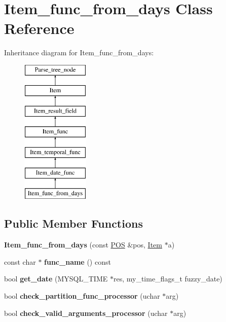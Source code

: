\hypertarget{classItem__func__from__days}{}\section{Item\+\_\+func\+\_\+from\+\_\+days Class Reference}
\label{classItem__func__from__days}
Inheritance diagram for Item\+\_\+func\+\_\+from\+\_\+days\+:\begin{figure}[H]
\begin{center}
\leavevmode
\includegraphics[height=7.000000cm]{classItem__func__from__days}
\end{center}
\end{figure}
\subsection*{Public Member Functions}
\begin{DoxyCompactItemize}
\item 
\mbox{\label{classItem__func__from__days_a2e3ecd015fdd1f07ef37ab00ea13d9ce}} 
{\bfseries Item\+\_\+func\+\_\+from\+\_\+days} (const \mbox{\hyperlink{structYYLTYPE}{P\+OS}} \&pos, \mbox{\hyperlink{classItem}{Item}} $\ast$a)
\item 
\mbox{\label{classItem__func__from__days_ab457462683d0af23448a4240cf6da48b}} 
const char $\ast$ {\bfseries func\+\_\+name} () const
\item 
\mbox{\label{classItem__func__from__days_a5ee525f6335d876bad27a4cc7b34b505}} 
bool {\bfseries get\+\_\+date} (M\+Y\+S\+Q\+L\+\_\+\+T\+I\+ME $\ast$res, my\+\_\+time\+\_\+flags\+\_\+t fuzzy\+\_\+date)
\item 
\mbox{\label{classItem__func__from__days_a795571b0b06fec7d02a0ab1e70c7d210}} 
bool {\bfseries check\+\_\+partition\+\_\+func\+\_\+processor} (uchar $\ast$arg)
\item 
\mbox{\label{classItem__func__from__days_a82b8824bc957582db370bd84739e8734}} 
bool {\bfseries check\+\_\+valid\+\_\+arguments\+\_\+processor} (uchar $\ast$arg)
\end{DoxyCompactItemize}
